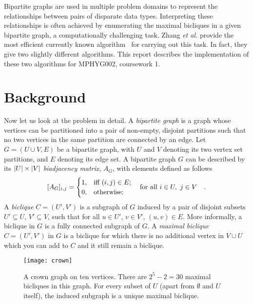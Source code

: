 Bipartite graphs are used in multiple problem domains to represent the relationships between pairs of disparate data types.
Interpreting these relationships is often achieved by enumerating the maximal bicliques in a given bipartite graph, a computationally challenging task.
Zhang \emph{et al.} provide the most efficient currently known algorithm~\cite{Zhang2014} for carrying out this task.
In fact, they give two slightly different algorithms.
This report describes the implementation of these two algorithms for MPHYG002, coursework 1.

\section{Background}

Now let us look at the problem in detail.
A \emph{bipartite graph} is a graph whose vertices can be partitioned into a pair of non-empty, disjoint partitions such that no two vertices in the same partition are connected by an edge.
Let $G= (U\cup V, E)$ be a bipartite graph, with $U$ and $V$ denoting its two vertex set partitions, and $E$ denoting its edge set.
A bipartite graph $G$ can be described by its $\abs{U}\times \abs{V}$ \emph{biadjacency matrix}, $A_G$, with elements defined as follows
\begin{equation}\label{eq:biadjacency}
    [A_G]_{i,j} = \begin{cases}
    1, & \text{iff $(i,j)\in E$};\\
    0, & \text{otherwise};
\end{cases}
\qq{for all $i\in U,\ j \in V$}. 
\end{equation}
A \emph{biclique} $C = (U', V')$ is a subgraph of $G$ induced by a pair of disjoint subsets $U'\subseteq U$, $V' \subseteq V$, such that for all $u\in U'$, $v \in V'$, $(u,v)\in E$.
More informally, a biclique in $G$ is a fully connected subgraph of $G$.
A \emph{maximal biclique} $C = (U',V')$ in $G$ is a biclique for which there is no additional vertex in $V\cup U$ which you can add to $C$ and it still remain a biclique.

\begin{wrapfigure}{r}{0.5\textwidth}
    \centering
    \texttt{[image: crown]}
    \caption{
    A crown graph on ten vertices.
    There are $2^{5}-2 = 30$ maximal bicliques in this graph.
    For every subset of $U$ (apart from $\emptyset$ and $U$ itself), the induced subgraph is a unique maximal biclique. 
    }
    \label{fig:crown}
\end{wrapfigure}


